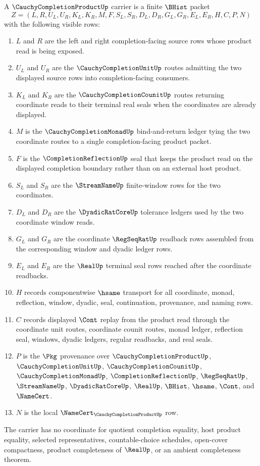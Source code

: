 \begin{definition}
\label{def:cauchy-completion-product-carrier}
A $\CauchyCompletionProductUp$ carrier is a finite $\BHist$ packet
$$
Z=(L,R,U_L,U_R,K_L,K_R,M,F,S_L,S_R,D_L,D_R,G_L,G_R,E_L,E_R,H,C,P,N)
$$
with the following visible rows:
\begin{enumerate}
\item $L$ and $R$ are the left and right completion-facing source rows whose product read is being exposed.
\item $U_L$ and $U_R$ are the $\CauchyCompletionUnitUp$ routes admitting the two displayed source rows into completion-facing consumers.
\item $K_L$ and $K_R$ are the $\CauchyCompletionCounitUp$ routes returning coordinate reads to their terminal real seals when the coordinates are already displayed.
\item $M$ is the $\CauchyCompletionMonadUp$ bind-and-return ledger tying the two coordinate routes to a single completion-facing product packet.
\item $F$ is the $\CompletionReflectionUp$ seal that keeps the product read on the displayed completion boundary rather than on an external host product.
\item $S_L$ and $S_R$ are the $\StreamNameUp$ finite-window rows for the two coordinates.
\item $D_L$ and $D_R$ are the $\DyadicRatCoreUp$ tolerance ledgers used by the two coordinate window reads.
\item $G_L$ and $G_R$ are the coordinate $\RegSeqRatUp$ readback rows assembled from the corresponding window and dyadic ledger rows.
\item $E_L$ and $E_R$ are the $\RealUp$ terminal seal rows reached after the coordinate readbacks.
\item $H$ records componentwise $\hsame$ transport for all coordinate, monad, reflection, window, dyadic, seal, continuation, provenance, and naming rows.
\item $C$ records displayed $\Cont$ replay from the product read through the coordinate unit routes, coordinate counit routes, monad ledger, reflection seal, windows, dyadic ledgers, regular readbacks, and real seals.
\item $P$ is the $\Pkg$ provenance over $\CauchyCompletionProductUp$, $\CauchyCompletionUnitUp$, $\CauchyCompletionCounitUp$, $\CauchyCompletionMonadUp$, $\CompletionReflectionUp$, $\RegSeqRatUp$, $\StreamNameUp$, $\DyadicRatCoreUp$, $\RealUp$, $\BHist$, $\hsame$, $\Cont$, and $\NameCert$.
\item $N$ is the local $\NameCert_{\CauchyCompletionProductUp}$ row.
\end{enumerate}
The carrier has no coordinate for quotient completion equality, host product equality, selected representatives, countable-choice schedules, open-cover compactness, product completeness of $\RealUp$, or an ambient completeness theorem.
\end{definition}

